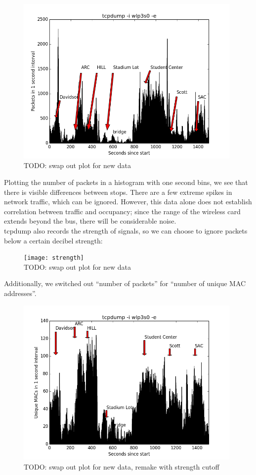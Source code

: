 \documentclass[letterpaper]{scrartcl}
\begin{document}
	\begin{figure}[H]
	\includegraphics[width=11cm]{packets}
	\\TODO: swap out plot for new data
	\centering
	\end{figure}

	Plotting the number of packets in a histogram with one second bins, we see that there is visible differences between stops.
	There are a few extreme spikes in network traffic, which can be ignored.
	However, this data alone does not establish correlation between traffic and occupancy; since the range of the wireless card extends beyond the bus, there will be considerable noise.
	\\
	tcpdump also records the strength of signals, so we can choose to ignore packets below a certain decibel strength:

	\begin{figure}[H]
	\texttt{[image: strength]}
	\\TODO: swap out plot for new data
	\centering
	\end{figure}

	Additionally, we switched out ``number of packets'' for ``number of unique MAC addresses''.

	\begin{figure}[H]
	\includegraphics[width=11cm]{unique}
	\\TODO: swap out plot for new data, remake with strength cutoff
	\centering
	\end{figure}
\end{document}
